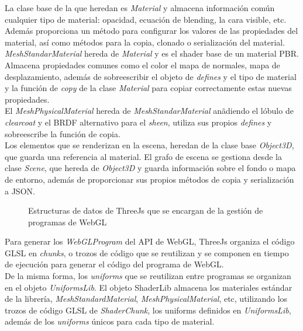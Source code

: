 La clase base de la que heredan es \textit{Material} y almacena informaci\'on com\'un
cualquier tipo de material: opacidad, ecuaci\'on de blending, la cara visible, etc. Adem\'as proporciona un m\'etodo
para configurar los valores de las propiedades del material, as\'i como m\'etodos para la copia, clonado o serializaci\'on
del material.\\

\textit{MeshStandarMaterial} hereda de \textit{Material} y es el shader base de un material PBR. Almacena propiedades comunes
como el color el mapa de normales, mapa de desplazamiento, adem\'as de sobreescribir el objeto de \textit{defines} y el tipo
de material y la funci\'on de \textit{copy} de la clase \textit{Material} para copiar correctamente
estas nuevas propiedades.\\

El \textit{MeshPhysicalMaterial} hereda de \textit{MeshStandarMaterial} an\~adiendo el l\'obulo de \textit{clearcoat} y
el BRDF alternativo para el \textit{sheen}, utiliza sus propios \textit{defines} y sobreescribe la funci\'on de copia.\\

Los elementos que se renderizan en la escena, heredan de la clase base \textit{Object3D}, que guarda una referencia
al material. El grafo de escena se gestiona desde la clase \textit{Scene}, que hereda de \textit{Object3D} y guarda
informaci\'on sobre el fondo o mapa de entorno, adem\'as de proporcionar sus propios m\'etodos de copia y serializaci\'on
a JSON.

\begin{figure}[H]
  \centering
  \caption{Estructuras de datos de ThreeJs que se encargan de la gesti\'on de programas de WebGL}
  \vspace{0.5cm}
\end{figure}

Para generar los \textit{WebGLProgram} del API de WebGL, ThreeJs organiza el c\'odigo GLSL en \textit{chunks}, o trozos de c\'odigo
que se reutilizan y se componen en tiempo de ejecuci\'on para generar el c\'odigo del programa de WebGL.\\

De la misma forma, los \textit{uniforms} que se reutilizan entre programas se organizan en el objeto \textit{UniformsLib}. El objeto ShaderLib almacena
los materiales est\'andar de la librer\'ia, \textit{MeshStandardMaterial}, \textit{MeshPhysicalMaterial}, etc, utilizando los trozos
de c\'odigo GLSL de \textit{ShaderChunk}, los uniforms definidos en \textit{UniformsLib}, adem\'as de los \textit{uniforms} \'unicos
para cada tipo de material.

